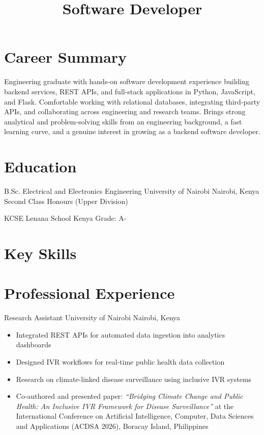 \documentclass[11pt,a4paper]{moderncv}
\title{Software Developer}
\begin{document}
\makecvtitle

\section{Career Summary}
Engineering graduate with hands-on software development experience building backend
services, REST APIs, and full-stack applications in Python, JavaScript, and Flask.
Comfortable working with relational databases, integrating third-party APIs, and
collaborating across engineering and research teams. Brings strong analytical and
problem-solving skills from an engineering background, a fast learning curve, and a
genuine interest in growing as a backend software developer.

\section{Education}

{B.Sc. Electrical and Electronics Engineering}
{University of Nairobi}
{Nairobi, Kenya}
{}
{Second Class Honours (Upper Division)}

{KCSE}
{Lenana School}
{Kenya}
{}
{Grade: A-}

\section{Key Skills}


\section{Professional Experience}

{Research Assistant}
{University of Nairobi}
{Nairobi, Kenya}
{}
{\begin{itemize}
\item Integrated REST APIs for automated data ingestion into analytics dashboards
\item Designed IVR workflows for real-time public health data collection
\item Research on climate-linked disease surveillance using inclusive IVR systems
\item Co-authored and presented paper: \textit{“Bridging Climate Change and Public Health: An Inclusive IVR Framework for Disease Surveillance”} at the International Conference on Artificial Intelligence, Computer, Data Sciences and Applications (ACDSA 2026), Boracay Island, Philippines
\end{itemize}}
\end{document}

